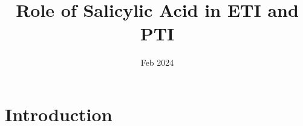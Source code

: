 \documentclass[a4]{article}
\title{Role of Salicylic Acid in ETI and PTI}
\author{}
\date{Feb 2024}
\begin{document}
	\maketitle
	\tableofcontents
	\section{Introduction}
  
\end{document}
